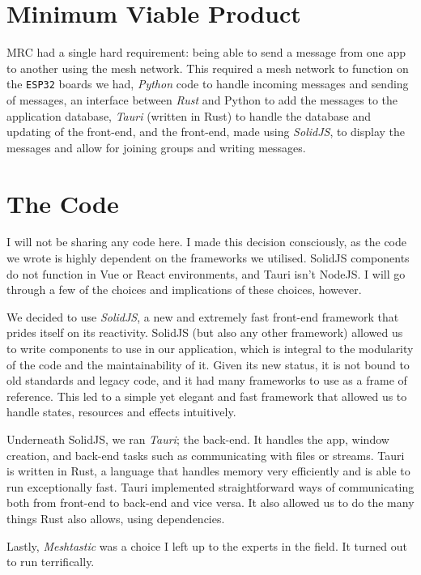 \documentclass{jatex-article}
\begin{document}
\section*{Minimum Viable Product}

MRC had a single hard requirement: being able to send a message from one app to
another using the mesh network. This required a mesh network to function on the
\texttt{ESP32} boards we had, \textit{Python} code to handle incoming messages
and sending of messages, an interface between \textit{Rust} and Python to add
the messages to the application database, \textit{Tauri} (written in Rust) to
handle the database and updating of the front-end, and the front-end, made
using \textit{SolidJS}, to display the messages and allow for joining groups
and writing messages.

\section*{The Code}

I will not be sharing any code here. I made this decision consciously, as the
code we wrote is highly dependent on the frameworks we utilised. SolidJS
components do not function in Vue or React environments, and Tauri isn't
NodeJS. I will go through a few of the choices and implications of these
choices, however.

We decided to use \textit{SolidJS}, a new and extremely fast front-end
framework that prides itself on its reactivity. SolidJS (but also any other
framework) allowed us to write components to use in our application, which is
integral to the modularity of the code and the maintainability of it. Given its
new status, it is not bound to old standards and legacy code, and it had many
frameworks to use as a frame of reference. This led to a simple yet elegant and
fast framework that allowed us to handle states, resources and effects
intuitively.

Underneath SolidJS, we ran \textit{Tauri}; the back-end. It handles the app,
window creation, and back-end tasks such as communicating with files or
streams. Tauri is written in Rust, a language that handles memory very
efficiently and is able to run exceptionally fast. Tauri implemented
straightforward ways of communicating both from front-end to back-end and vice
versa. It also allowed us to do the many things Rust also allows, using
dependencies.

Lastly, \textit{Meshtastic} was a choice I left up to the experts in the field.
It turned out to run terrifically.
\end{document}

